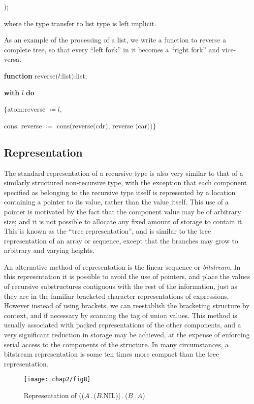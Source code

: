 \tabto{4.8em} $)$;

\noindent
where the type transfer to list type is left implicit.

As an example of the processing of a list, we write a function to reverse a complete tree, so that every ``left fork'' in it becomes a ``right fork'' and vice-versa.

\quad \textbf{function} reverse$(l$:list$)$:list;

\quad \quad \textbf{with} $l$ \textbf{do}

\quad \quad \quad $\{$atom:reverse $\coloneq l$,

\quad \quad \quad cons: reverse $\coloneq$ cons$($reverse$($cdr$)$, reverse $($car$))\}$

\subsection{Representation}

The standard representation of a recursive type is also very similar to that of a similarly structured non-recursive type, with the exception that each component specified as belonging to the recursive type itself is represented by a location containing a pointer to its value, rather than the value itself. This use of a pointer is motivated by the fact that the component value may be of arbitrary size; and it is not possible to allocate any fixed amount of storage to contain it. This is known as the ``tree representation'', and is similar to the tree representation of an array or sequence, except that the branches may grow to arbitrary and varying heights.

An alternative method of representation is the linear sequence or \textit{bitstream}. In this representation it is possible to avoid the use of pointers, and place the values of recursive substructures contiguous with the rest of the information, just as they are in the familiar bracketed character representations of expressions. However instead of using brackets, we can reestablish the bracketing structure by context, and if necessary by scanning the tag of union values. This method is usually associated with packed representations of the other components, and a very significant reduction in storage may be achieved, at the expense of enforcing serial access to the components of the structure. In many circumstances, a bitstream representation is some ten times more compact than the tree representation.

\begin{figure}[h]
	\centering
	\texttt{[image: chap2/fig8]}
	\caption{Representation of (($A$\,.\,($B$.NIL))\,.\,($B$\,.\,$A$)}
\end{figure}

